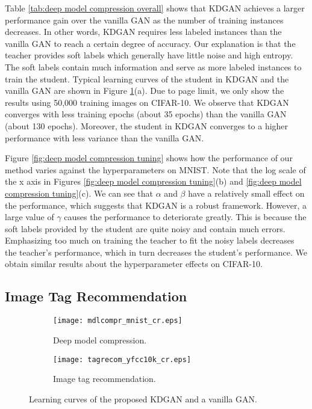 \documentclass{article}
\begin{document}
Table \ref{tab:deep model compression overall} shows that KDGAN achieves a larger performance gain over the vanilla GAN as the number of training instances decreases.
In other words, KDGAN requires less labeled instances than the vanilla GAN to reach a certain degree of accuracy.
Our explanation is that the teacher provides soft labels which generally have little noise and high entropy.
The soft labels contain much information and serve as more labeled instances to train the student.
Typical learning curves of the student in KDGAN and the vanilla GAN are shown in Figure \ref{fig:learning curves}(a).
Due to page limit, we only show the results using 50,000 training images on CIFAR-10.
We observe that KDGAN converges with less training epochs (about 35 epochs) than the vanilla GAN (about 130 epochs).
Moreover, the student in KDGAN converges to a higher performance with less variance than the vanilla GAN.

Figure \ref{fig:deep model compression tuning} shows how the performance of our method varies against the hyperparameters on MNIST.
Note that the log scale of the x axis in Figures \ref{fig:deep model compression tuning}(b) and \ref{fig:deep model compression tuning}(c).
We can see that $\alpha$ and $\beta$ have a relatively small effect on the performance, which suggests that KDGAN is a robust framework.
However, a large value of $\gamma$ causes the performance to deteriorate greatly.
This is because the soft labels provided by the student are quite noisy and contain much errors.
Emphasizing too much on training the teacher to fit the noisy labels decreases the teacher's performance, which in turn decreases the student's performance.
We obtain similar results about the hyperparameter effects on CIFAR-10.

\subsection{Image Tag Recommendation} \label{sec:image tag recommendation}

\begin{figure}[tbp]
\centering
\setlength{\abovecaptionskip}{4pt plus 0pt minus 0pt}
\begin{subfigure}{0.49\textwidth}
 \centering
 \texttt{[image: mdlcompr\_mnist\_cr.eps]}
  \caption{ Deep model compression. }
\end{subfigure}
\begin{subfigure}{0.49\textwidth}
 \centering
 \texttt{[image: tagrecom\_yfcc10k\_cr.eps]}
  \caption{ Image tag recommendation. }
\end{subfigure}
\caption{ Learning curves of the proposed KDGAN and a vanilla GAN. }
\label{fig:learning curves}
\end{figure}
\end{document}
